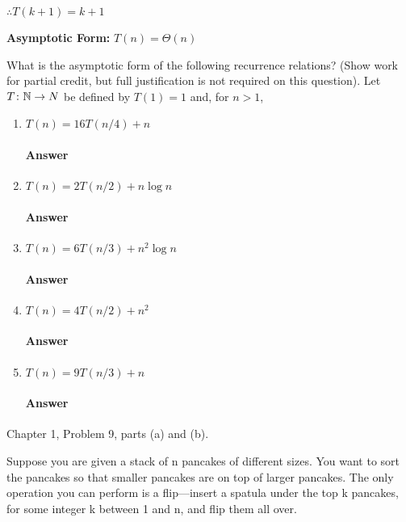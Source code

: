 \documentclass{article}
\begin{document}
$\therefore T(k+1)=k+1$

{\bf Asymptotic Form:} $T(n)=\Theta(n)$



\todo{}


\collab{\todo{}}

What is the asymptotic form of the following recurrence
relations? (Show work for partial credit, but full justification is not required
on this question).
Let $T \colon {\mathbb N} \to N$ be defined by $T(1)=1$ and, for $n>1$,
\begin{enumerate}
	\item $T(n) = 16 T(n/4) + n$
	      \paragraph{Answer} \todo{}
	\item $T(n) = 2 T(n/2) + n \log{n}$
	      \paragraph{Answer} \todo{}
	\item $T(n) = 6 T(n/3) + n^2 \log{n}$
	      \paragraph{Answer} \todo{}
	\item $T(n) = 4 T(n/2) + n^2$
	      \paragraph{Answer} \todo{}
	\item $T(n) = 9 T(n/3) + n$
	      \paragraph{Answer} \todo{}
\end{enumerate}


\collab{\todo{}}

Chapter 1, Problem 9, parts (a) and (b).

Suppose you are given a stack of n pancakes of different sizes. You want to
sort the pancakes so that smaller pancakes are on top of larger pancakes.
The only operation you can perform is a flip—insert a spatula under the
top k pancakes, for some integer k between 1 and n, and flip them all over.
\end{document}
